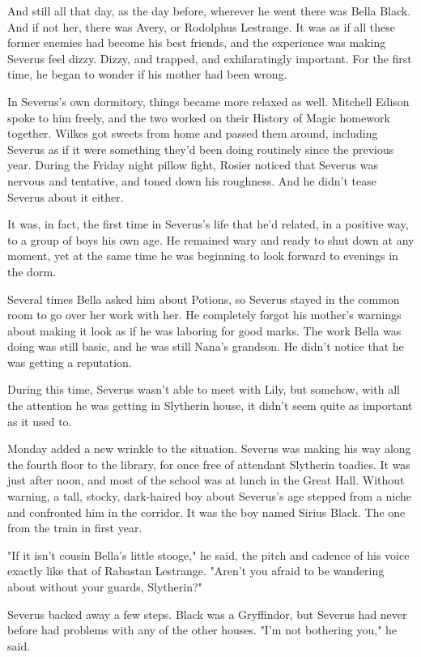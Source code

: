 And still all that day, as the day before, wherever he went there was Bella Black. And if not her, there was Avery, or Rodolphus Lestrange. It was as if all these former enemies had become his best friends, and the experience was making Severus feel dizzy. Dizzy, and trapped, and exhilaratingly important. For the first time, he began to wonder if his mother had been wrong.

In Severus's own dormitory, things became more relaxed as well. Mitchell Edison spoke to him freely, and the two worked on their History of Magic homework together. Wilkes got sweets from home and passed them around, including Severus as if it were something they'd been doing routinely since the previous year. During the Friday night pillow fight, Rosier noticed that Severus was nervous and tentative, and toned down his roughness. And he didn't tease Severus about it either.

It was, in fact, the first time in Severus's life that he'd related, in a positive way, to a group of boys his own age. He remained wary and ready to shut down at any moment, yet at the same time he was beginning to look forward to evenings in the dorm.

Several times Bella asked him about Potions, so Severus stayed in the common room to go over her work with her. He completely forgot his mother's warnings about making it look as if he was laboring for good marks. The work Bella was doing was still basic, and he was still Nana's grandson. He didn't notice that he was getting a reputation.

During this time, Severus wasn't able to meet with Lily, but somehow, with all the attention he was getting in Slytherin house, it didn't seem quite as important as it used to.

Monday added a new wrinkle to the situation. Severus was making his way along the fourth floor to the library, for once free of attendant Slytherin toadies. It was just after noon, and most of the school was at lunch in the Great Hall. Without warning, a tall, stocky, dark-haired boy about Severus's age stepped from a niche and confronted him in the corridor. It was the boy named Sirius Black. The one from the train in first year.

"If it isn't cousin Bella's little stooge," he said, the pitch and cadence of his voice exactly like that of Rabastan Lestrange. "Aren't you afraid to be wandering about without your guards, Slytherin?"

Severus backed away a few steps. Black was a Gryffindor, but Severus had never before had problems with any of the other houses. "I'm not bothering you," he said.

